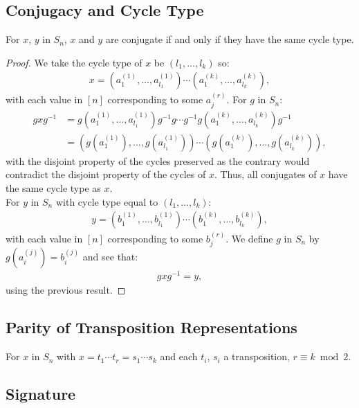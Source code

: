 \subsection{Conjugacy and Cycle Type}

For $x$, $y$ in $S_n$, $x$ and $y$ are conjugate if and only if
they have the same cycle type.

\begin{proof}
    We take the cycle type of $x$ be $(l_1, \ldots, l_k)$ so: \begin{align*}
        x = (a_1^{(1)}, \ldots, a_{l_1}^{(1)}) \cdots (a_1^{(k)}, \ldots, a_{l_k}^{(k)}),
    \end{align*} with each value in $[n]$ corresponding to some $a_j^{(r)}$.
    For $g$ in $S_n$: \begin{align*}
        gxg^{-1} 
        &= g(a_1^{(1)}, \ldots, a_{l_1}^{(1)})g^{-1}g \cdots g^{-1}g(a_1^{(k)}, \ldots, a_{l_k}^{(k)})g^{-1} \\
        &= (g(a_1^{(1)}), \ldots, g(a_{l_1}^{(1)})) \cdots (g(a_1^{(k)}), \ldots, g(a_{l_k}^{(k)})),
    \end{align*} with the disjoint property of the cycles preserved as the
    contrary would contradict the disjoint property of the cycles of $x$.
    Thus, all conjugates of $x$ have the same cycle type as $x$.
    \\[\baselineskip]
    For $y$ in $S_n$ with cycle type equal to $(l_1, \ldots, l_k)$: \begin{align*}
        y = (b_1^{(1)}, \ldots, b_{l_1}^{(1)}) \cdots (b_1^{(k)}, \ldots, b_{l_k}^{(k)}),
    \end{align*} with each value in $[n]$ corresponding to some $b_j^{(r)}$.
    We define $g$ in $S_n$ by $g(a_i^{(j)}) = b_i^{(j)}$ and see that: \begin{align*}
        gxg^{-1} = y,
    \end{align*} using the previous result.
\end{proof}

\subsection{Parity of Transposition Representations}

For $x$ in $S_n$ with $x = t_1 \cdots t_r = s_1 \cdots s_k$ and
each $t_i$, $s_i$ a transposition, $r \equiv k \bmod 2$.

\subsection{Signature}

